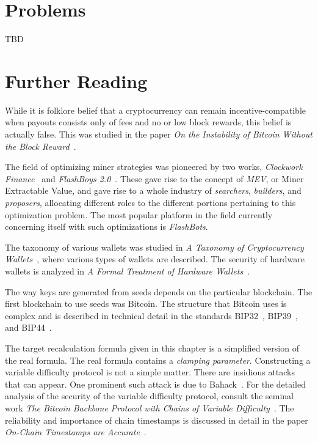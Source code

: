 \section*{Problems}
TBD

\section*{Further Reading}
While it is folklore belief that a cryptocurrency can remain incentive-compatible
when payouts consists only of fees and no or low block rewards, this belief is actually
false. This was studied in the paper
\emph{On the Instability of Bitcoin Without the Block Reward}~\cite{instability}.

The field of optimizing miner strategies was pioneered by two works,
\emph{Clockwork Finance}~\cite{clockwork} and \emph{FlashBoys 2.0}~\cite{flashboys}.
These gave rise to the concept of \emph{MEV}, or Miner Extractable Value, and
gave rise to a whole industry of \emph{searchers}, \emph{builders}, and \emph{proposers},
allocating different roles to the different portions pertaining to this optimization
problem. The most popular platform in the field currently concerning itself with
such optimizations is \emph{FlashBots}.

The taxonomy of various wallets was studied in
\emph{A Taxonomy of Cryptocurrency Wallets}~\cite{wallet-taxonomy}, where various
types of wallets are described. The security of hardware wallets is analyzed in
\emph{A Formal Treatment of Hardware Wallets}~\cite{hardware-wallets}.

The way keys are generated from seeds depends on the particular blockchain.
The first blockchain to use seeds was Bitcoin. The structure that Bitcoin
uses is complex and is described in technical detail in the standards
BIP32~\cite{bip32}, BIP39~\cite{bip39}, and BIP44~\cite{bip44}.


The target recalculation formula given in this chapter is a simplified
version of the real formula. The real formula contains a \emph{clamping
parameter}. Constructing a variable difficulty protocol is not a simple
matter. There are insidious attacks that can appear. One prominent such
attack is due to Bahack~\cite{bahack}. For the detailed analysis of the
security of the variable difficulty protocol, consult the seminal
work \emph{The Bitcoin Backbone Protocol with Chains of Variable
Difficulty}~\cite{varbackbone}. The reliability and importance of chain
timestamps is discussed in detail in the paper \emph{On-Chain Timestamps
are Accurate}~\cite{timeliness}.
